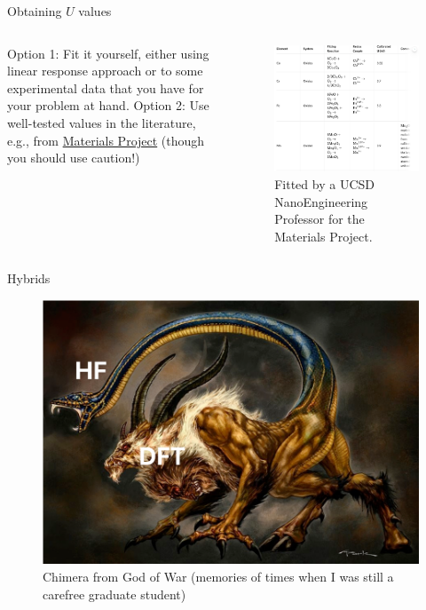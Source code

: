 \documentclass[aspectratio=169]{beamer}
\begin{document}
    \begin{frame}{Obtaining $U$ values}
        \begin{columns}
            Option 1: Fit it yourself, either using linear response approach or to some experimental data that you have for your problem at hand.\newline
            \newline
            Option 2: Use well-tested values in the literature, e.g., from \href{https://docs.materialsproject.org/methodology/materials-methodology/calculation-details/gga+u-calculations/hubbard-u-values}{Materials Project} (though you should use caution!)

            \begin{figure}
                \centering
                \includegraphics[width=0.9\linewidth]{lectures/figures/6_mp_u_values.png}
                \caption{Fitted by a UCSD NanoEngineering Professor for the Materials Project.}
            \end{figure}
        \end{columns}

    \end{frame}


    \begin{frame}{Hybrids}
        \begin{figure}
            \centering
            \includegraphics[width=0.5\linewidth]{lectures/figures/6_chimera.png}
            \caption{Chimera from God of War (memories of times when I was still a carefree graduate student)}
        \end{figure}
    \end{frame}
\end{document}
